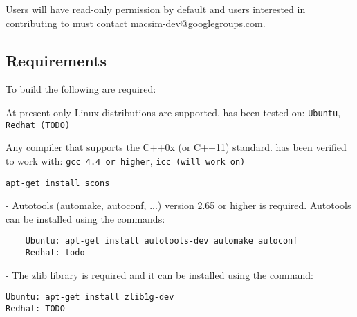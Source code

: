 Users will have read-only permission by default and users interested
in contributing to \SIM must contact
\href{mailto:macsim-dev@googlegroups.com}{macsim-dev@googlegroups.com}.



\subsection{Requirements}

To build \SIM the following are required:

\begingroup
\renewcommand\descriptionlabel[1]{\textit{\hspace\labelsep{#1}}}
\begin{description}\firmlist
  \item[Operating System] At present only Linux distributions are supported. \SIM has been tested on:
   \Verb+Ubuntu+, \Verb+Redhat (TODO)+
  \item[Compiler] Any compiler that supports the C++0x (or C++11)
    standard. \SIM has been verified to work with: \Verb+gcc 4.4 or higher+, \Verb+icc (will work on)+
  \item[SConstruct]

    \Verb+apt-get install scons+

\ignore
	 {
	  \item[Autotools] - Autotools (automake, autoconf,
		...) version 2.65 or higher is required. Autotools can be installed using the commands:
	\begin{Verbatim}
	Ubuntu: apt-get install autotools-dev automake autoconf
	Redhat: todo
	\end{Verbatim}
	}
  
  \item[Libraries] - The zlib library is required and it can be installed using the command:
\begin{Verbatim}
Ubuntu: apt-get install zlib1g-dev
Redhat: TODO
\end{Verbatim}
\end{description}
\endgroup




